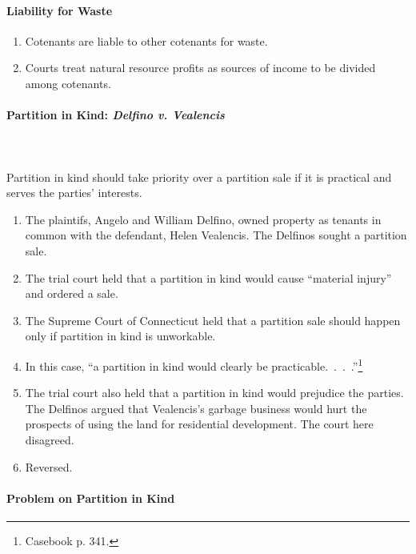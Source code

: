 \paragraph{Liability for Waste}

\begin{enumerate}
    \item Cotenants are liable to other cotenants for waste.
    \item Courts treat natural resource profits as sources of income to be 
    divided among cotenants.
\end{enumerate}

\paragraph{Partition in Kind: \emph{Delfino v. Vealencis}}
~\\\\
Partition in kind should take priority over a partition sale if it is 
practical and serves the parties' interests.

\begin{enumerate}
    \item The plaintifs, Angelo and William Delfino, owned property as tenants 
    in common with the defendant, Helen Vealencis. The Delfinos sought a 
    partition sale.
    \item The trial court held that a partition in kind would cause ``material 
    injury'' and ordered a sale.
    \item The Supreme Court of Connecticut held that a partition sale should 
    happen only if partition in kind is unworkable.
    \item In this case, ``a partition in kind would clearly be 
    practicable.~.~.~.''\footnote{Casebook p. 341.}
    \item The trial court also held that a partition in kind would prejudice 
    the parties. The Delfinos argued that Vealencis's garbage business would 
    hurt the prospects of using the land for residential development. The 
    court here disagreed.
    \item Reversed.
\end{enumerate}

\paragraph{Problem on Partition in Kind}

